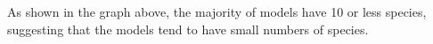 \documentclass[landscape,a1paper,fontscale=0.46]{baposter}
\begin{document}
\begin{poster}
{\begin{multicols}{2}
 As shown in the graph above, the majority of models have 10 or less species, suggesting that the models tend to have small numbers of species. \\
 
 {}
 {}
 

\end{multicols}}
\end{poster}
\end{document}
